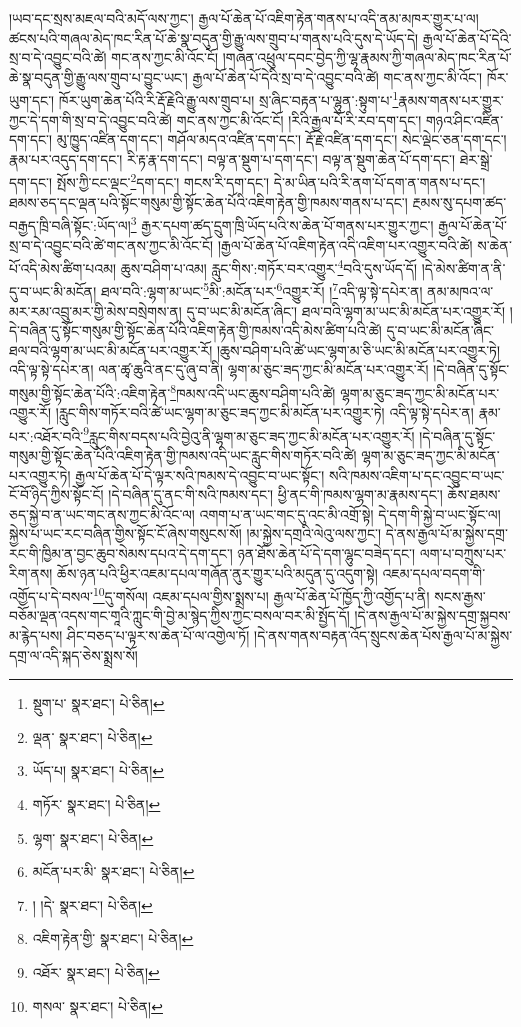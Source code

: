།ཡབ་དང་སྲས་མཇལ་བའི་མདོ་ལས་ཀྱང་། རྒྱལ་པོ་ཆེན་པོ་འཇིག་རྟེན་གནས་པ་འདི་ནམ་མཁར་གྱུར་པ་ལ། ཚངས་པའི་གཞལ་མེད་ཁང་རིན་པོ་ཆེ་སྣ་བདུན་གྱི་རྒྱུ་ལས་གྲུབ་པ་གནས་པའི་དུས་དེ་ཡོད་དེ། རྒྱལ་པོ་ཆེན་པོ་དེའི་སྲ་བ་དེ་འབྱུང་བའི་ཚེ། གང་ནས་ཀྱང་མི་འོང་ངོ། །གཞན་འཕྲུལ་དབང་བྱེད་ཀྱི་ལྷ་རྣམས་ཀྱི་གཞལ་མེད་ཁང་རིན་པོ་ཆེ་སྣ་བདུན་གྱི་རྒྱུ་ལས་གྲུབ་པ་བྱུང་ཡང་། རྒྱལ་པོ་ཆེན་པོ་དེའི་སྲ་བ་དེ་འབྱུང་བའི་ཚེ། གང་ནས་ཀྱང་མི་འོང་། ཁོར་ཡུག་དང་། ཁོར་ཡུག་ཆེན་པོའི་རི་རྡོ་རྗེའི་རྒྱུ་ལས་གྲུབ་པ། སྲ་ཞིང་བརྟན་པ་ལྷུན་:སྟུག་པ་\footnote{སྡུག་པ་  སྣར་ཐང་།  པེ་ཅིན། }རྣམས་གནས་པར་གྱུར་ཀྱང་དེ་དག་གི་སྲ་བ་དེ་འབྱུང་བའི་ཚེ། གང་ནས་ཀྱང་མི་འོང་ངོ། །རིའི་རྒྱལ་པོ་རི་རབ་དག་དང་། གཉའ་ཤིང་འཛིན་དག་དང་། མུ་ཁྱུད་འཛིན་དག་དང་། གཤོལ་མདའ་འཛིན་དག་དང་། རྡོ་རྗེ་འཛིན་དག་དང་། སེང་ལྡེང་ཅན་དག་དང་། རྣམ་པར་འདུད་དག་དང་། རི་རྟ་རྣ་དག་དང་། བལྟ་ན་སྡུག་པ་དག་དང་། བལྟ་ན་སྡུག་ཆེན་པོ་དག་དང་། ཐེར་སྒྲེ་དག་དང་། སྤོས་ཀྱི་ངང་ལྡང་\footnote{ལྡན་  སྣར་ཐང་།  པེ་ཅིན། }དག་དང་། གངས་རི་དག་དང་། དེ་མ་ཡིན་པའི་རི་ནག་པོ་དག་ན་གནས་པ་དང་། ཐམས་ཅད་དང་ལྡན་པའི་སྟོང་གསུམ་གྱི་སྟོང་ཆེན་པོའི་འཇིག་རྟེན་གྱི་ཁམས་གནས་པ་དང་། རྔམས་སུ་དཔག་ཚད་བརྒྱད་ཁྲི་བཞི་སྟོང་:ཡོད་ལ།\footnote{ཡོད་པ།  སྣར་ཐང་།  པེ་ཅིན། } རྒྱར་དཔག་ཚད་དྲུག་ཁྲི་ཡོད་པའི་ས་ཆེན་པོ་གནས་པར་གྱུར་ཀྱང་། རྒྱལ་པོ་ཆེན་པོ་སྲ་བ་དེ་འབྱུང་བའི་ཚེ་གང་ནས་ཀྱང་མི་འོང་ངོ། །རྒྱལ་པོ་ཆེན་པོ་འཇིག་རྟེན་འདི་འཇིག་པར་འགྱུར་བའི་ཚེ། ས་ཆེན་པོ་འདི་མེས་ཚིག་པའམ། ཆུས་བཤིག་པ་འམ། རླུང་གིས་:གཏོར་བར་འགྱུར་\footnote{གཏོར་  སྣར་ཐང་།  པེ་ཅིན། }བའི་དུས་ཡོད་དོ། །དེ་མེས་ཚིག་ན་ནི་དུ་བ་ཡང་མི་མངོན། ཐལ་བའི་:ལྷག་མ་ཡང་\footnote{ལྷག་  སྣར་ཐང་།  པེ་ཅིན། }མི་:མངོན་པར་\footnote{མངོན་པར་མི་  སྣར་ཐང་།  པེ་ཅིན། }འགྱུར་རོ། །\footnote{། །དེ་  སྣར་ཐང་།  པེ་ཅིན། }འདི་ལྟ་སྟེ་དཔེར་ན། ནམ་མཁའ་ལ་མར་རམ་འབྲུ་མར་གྱི་མེས་བསྲེགས་ན། དུ་བ་ཡང་མི་མངོན་ཞིང་། ཐལ་བའི་ལྷག་མ་ཡང་མི་མངོན་པར་འགྱུར་རོ། །དེ་བཞིན་དུ་སྟོང་གསུམ་གྱི་སྟོང་ཆེན་པོའི་འཇིག་རྟེན་གྱི་ཁམས་འདི་མེས་ཚིག་པའི་ཚེ། དུ་བ་ཡང་མི་མངོན་ཞིང་ཐལ་བའི་ལྷག་མ་ཡང་མི་མངོན་པར་འགྱུར་རོ། །ཆུས་བཤིག་པའི་ཚེ་ཡང་ལྷག་མ་ཅི་ཡང་མི་མངོན་པར་འགྱུར་ཏེ། འདི་ལྟ་སྟེ་དཔེར་ན། ལན་ཚྭ་ཆུའི་ནང་དུ་ཞུ་བ་ནི། ལྷག་མ་ཅུང་ཟད་ཀྱང་མི་མངོན་པར་འགྱུར་རོ། །དེ་བཞིན་དུ་སྟོང་གསུམ་གྱི་སྟོང་ཆེན་པོའི་:འཇིག་རྟེན་\footnote{འཇིག་རྟེན་གྱི་  སྣར་ཐང་།  པེ་ཅིན། }ཁམས་འདི་ཡང་ཆུས་བཤིག་པའི་ཚེ། ལྷག་མ་ཅུང་ཟད་ཀྱང་མི་མངོན་པར་འགྱུར་རོ། །རླུང་གིས་གཏོར་བའི་ཚེ་ཡང་ལྷག་མ་ཅུང་ཟད་ཀྱང་མི་མངོན་པར་འགྱུར་ཏེ། འདི་ལྟ་སྟེ་དཔེར་ན། རྣམ་པར་:འཐོར་བའི་\footnote{འཐོར་  སྣར་ཐང་།  པེ་ཅིན། }རླུང་གིས་བདས་པའི་བྱེའུ་ནི་ལྷག་མ་ཅུང་ཟད་ཀྱང་མི་མངོན་པར་འགྱུར་རོ། །དེ་བཞིན་དུ་སྟོང་གསུམ་གྱི་སྟོང་ཆེན་པོའི་འཇིག་རྟེན་གྱི་ཁམས་འདི་ཡང་རླུང་གིས་གཏོར་བའི་ཚེ། ལྷག་མ་ཅུང་ཟད་ཀྱང་མི་མངོན་པར་འགྱུར་ཏེ། རྒྱལ་པོ་ཆེན་པོ་དེ་ལྟར་སའི་ཁམས་དེ་འབྱུང་བ་ཡང་སྟོང་། སའི་ཁམས་འཇིག་པ་དང་འབྱུང་བ་ཡང་ངོ་བོ་ཉིད་ཀྱིས་སྟོང་ངོ། །དེ་བཞིན་དུ་ནང་གི་སའི་ཁམས་དང་། ཕྱི་ནང་གི་ཁམས་ལྷག་མ་རྣམས་དང་། ཆོས་ཐམས་ཅད་སྐྱེ་བ་ན་ཡང་གང་ནས་ཀྱང་མི་འོང་ལ། འགག་པ་ན་ཡང་གང་དུ་འང་མི་འགྲོ་སྟེ། དེ་དག་གི་སྐྱེ་བ་ཡང་སྟོང་ལ། སྐྱེས་པ་ཡང་རང་བཞིན་གྱིས་སྟོང་ངོ་ཞེས་གསུངས་སོ། །མ་སྐྱེས་དགྲའི་ལེའུ་ལས་ཀྱང་། དེ་ནས་རྒྱལ་པོ་མ་སྐྱེས་དགྲ་རང་གི་ཁྱིམ་ན་བྱང་ཆུབ་སེམས་དཔའ་དེ་དག་དང་། ཉན་ཐོས་ཆེན་པོ་དེ་དག་ལྷུང་བཟེད་དང་། ལག་པ་བཀྲུས་པར་རིག་ནས། ཆོས་ཉན་པའི་ཕྱིར་འཇམ་དཔལ་གཞོན་ནུར་གྱུར་པའི་མདུན་དུ་འདུག་སྟེ། འཇམ་དཔལ་བདག་གི་འགྱོད་པ་དེ་བསལ་\footnote{གསལ་  སྣར་ཐང་།  པེ་ཅིན། }དུ་གསོལ། འཇམ་དཔལ་གྱིས་སྨྲས་པ། རྒྱལ་པོ་ཆེན་པོ་ཁྱོད་ཀྱི་འགྱོད་པ་ནི། སངས་རྒྱས་བཅོམ་ལྡན་འདས་གང་གཱའི་ཀླུང་གི་བྱེ་མ་སྙེད་ཀྱིས་ཀྱང་བསལ་བར་མི་སྤྱོད་དོ། །དེ་ནས་རྒྱལ་པོ་མ་སྐྱེས་དགྲ་སྐྱབས་མ་རྙེད་པས། ཤིང་བཅད་པ་ལྟར་ས་ཆེན་པོ་ལ་འགྱེལ་ཏོ། །དེ་ནས་གནས་བརྟན་འོད་སྲུངས་ཆེན་པོས་རྒྱལ་པོ་མ་སྐྱེས་དགྲ་ལ་འདི་སྐད་ཅེས་སྨྲས་སོ། 